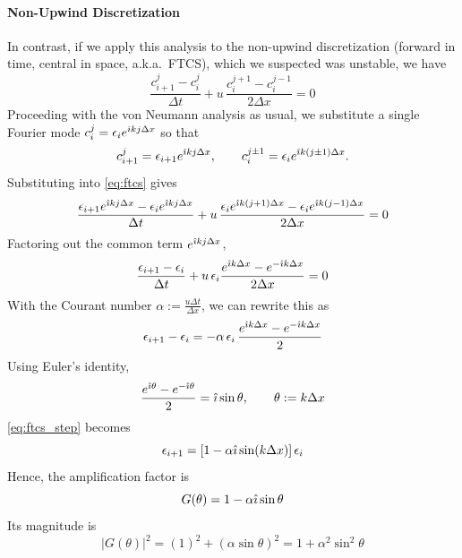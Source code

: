 \paragraph*{Non-Upwind Discretization}
In contrast, if we apply this analysis to the non-upwind discretization (forward in time, central in space, a.k.a.\ FTCS), which we suspected was unstable, we have
\begin{equation}
    \frac{c_{i+1}^j - c_i^j}{\Delta t}
    + u\,\frac{c_i^{j+1}-c_i^{j-1}}{2\Delta x}=0
    \label{eq:ftcs}
\end{equation}
Proceeding with the von Neumann analysis as usual, we substitute a single Fourier mode $c_i^j=\epsilon_i e^{\hat{\imath} kj\Delta x}$ so that
\begin{equation}
c_{i+1}^j=\epsilon_{i+1}e^{\hat{\imath} kj\Delta x},\qquad
c_i^{j\pm 1}=\epsilon_i e^{\hat{\imath} k(j\pm 1)\Delta x}.
\end{equation}
Substituting into \autoref{eq:ftcs} gives
\begin{equation}
    \frac{\epsilon_{i+1}e^{\hat{\imath} kj\Delta x}-\epsilon_ie^{\hat{\imath} kj\Delta x}}{\Delta t}
    +u\,\frac{\epsilon_i e^{\hat{\imath} k(j+1)\Delta x}-\epsilon_i e^{\hat{\imath} k(j-1)\Delta x}}{2\Delta x}=0
\end{equation}
Factoring out the common term $e^{\hat{\imath} kj\Delta x}$,
\begin{equation}
    \frac{\epsilon_{i+1}-\epsilon_i}{\Delta t}
    +u\,\epsilon_i\frac{e^{\hat{\imath} k\Delta x}-e^{-\hat{\imath} k\Delta x}}{2\Delta x}=0
    \label{eq:ftcs_factored}
\end{equation}
With the Courant number $\alpha := \frac{u\Delta t}{\Delta x}$, we can rewrite this as
\begin{equation}
    \epsilon_{i+1}-\epsilon_i
    = -\alpha\,\epsilon_i\,\frac{e^{\hat{\imath} k\Delta x}-e^{-\hat{\imath} k\Delta x}}{2}
    \label{eq:ftcs_step}
\end{equation}
Using Euler's identity,
\begin{equation}
    \frac{e^{\hat{\imath}\theta}-e^{-\hat{\imath}\theta}}{2}
    = \hat{\imath}\sin\theta,
    \qquad \theta:=k\Delta x
\end{equation}
\autoref{eq:ftcs_step} becomes
\begin{equation}
    \epsilon_{i+1}=\left[1-\alpha \hat{\imath}\sin(k\Delta x)\right]\epsilon_i
    \label{eq:G_ftcs}
\end{equation}
Hence, the amplification factor is
\begin{equation}
    G(\theta)=1-\alpha \hat{\imath}\sin\theta
\end{equation}
Its magnitude is
\begin{equation}
    |G(\theta)|^2
    =\left(1\right)^2+\left(\alpha\sin\theta\right)^2
    =1+\alpha^2\sin^2\theta
\end{equation}
